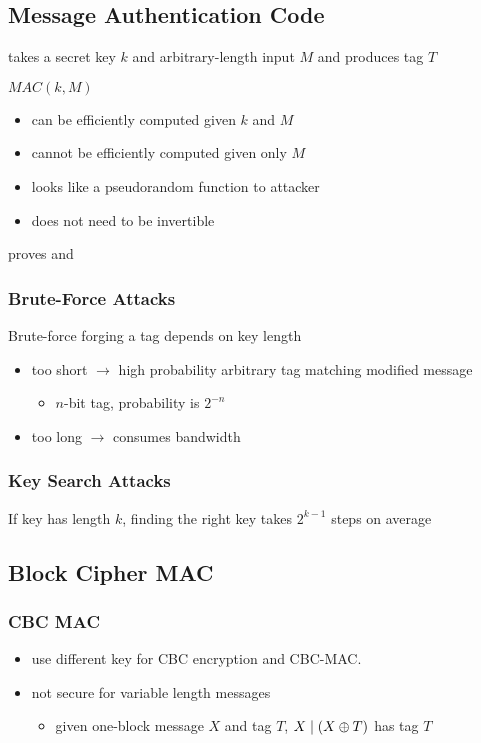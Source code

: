 \documentclass[draft]{article}
\begin{document}
\subsection{Message Authentication Code}
takes a secret key $k$ and arbitrary-length input $M$ and produces tag $T$

$MAC(k, M)$
\begin{itemize}[nosep]
    \item can be efficiently computed given $k$ and $M$
    \item cannot be efficiently computed given only $M$
    \item looks like a pseudorandom function to attacker
    \item does not need to be invertible
\end{itemize}
proves  and 
\subsubsection{Brute-Force Attacks}
Brute-force forging a tag depends on key length
\begin{itemize}[nosep]
    \item too short $\rightarrow$ high probability arbitrary tag matching modified message
          \begin{itemize}[nosep]\item $n$-bit tag, probability is $2^{-n}$\end{itemize}
    \item too long $\rightarrow$ consumes bandwidth
\end{itemize}
\subsubsection{Key Search Attacks}
If key has length $k$, finding the right key takes $2^{k-1}$ steps on average
\subsection{Block Cipher MAC}
\subsubsection*{CBC MAC}
\begin{itemize}[nosep]
    \item use different key for CBC encryption and CBC-MAC.
    \item not secure for variable length messages
          \begin{itemize}[nosep]\item given one-block message $X$ and tag $T$, $X \mid (X \oplus T)$ has tag $T$\end{itemize}
\end{itemize}
\end{document}
